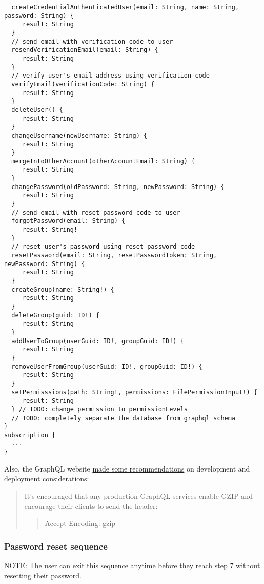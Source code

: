 \begin{verbatim}
  createCredentialAuthenticatedUser(email: String, name: String, password: String) {
     result: String
  }
  // send email with verification code to user
  resendVerificationEmail(email: String) {
     result: String
  }
  // verify user's email address using verification code
  verifyEmail(verificationCode: String) {
     result: String
  }
  deleteUser() {
     result: String
  }
  changeUsername(newUsername: String) {
     result: String
  }
  mergeIntoOtherAccount(otherAccountEmail: String) {
     result: String
  }
  changePassword(oldPassword: String, newPassword: String) {
     result: String
  }
  // send email with reset password code to user
  forgotPassword(email: String) {
     result: String!
  }
  // reset user's password using reset password code
  resetPassword(email: String, resetPasswordToken: String, newPassword: String) {
     result: String
  }
  createGroup(name: String!) {
     result: String
  }
  deleteGroup(guid: ID!) {
     result: String
  }
  addUserToGroup(userGuid: ID!, groupGuid: ID!) {
     result: String
  }
  removeUserFromGroup(userGuid: ID!, groupGuid: ID!) {
     result: String
  }
  setPermisssions(path: String!, permissions: FilePermissionInput!) {
     result: String
  } // TODO: change permission to permissionLevels
  // TODO: completely separate the database from graphql schema
}
subscription {
  ...
}
\end{verbatim}

Also, the GraphQL website
\href{https://graphql.org/learn/best-practices/}{made some
recommendations} on development and deployment considerations:

\begin{quote}
It's encouraged that any production GraphQL services enable GZIP and
encourage their clients to send the header:

\begin{quote}
Accept-Encoding: gzip
\end{quote}
\end{quote}

\hypertarget{password-reset-sequence}{%
\subsubsection{Password reset sequence}\label{password-reset-sequence}}

NOTE: The user can exit this sequence anytime before they reach step 7
without resetting their password.

